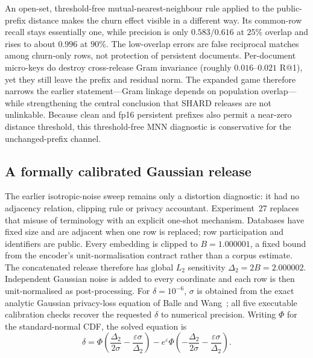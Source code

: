 \documentclass[11pt,a4paper]{article}
\begin{document}
An open-set, threshold-free mutual-nearest-neighbour rule applied to the
public-prefix distance makes the churn effect visible in a different way. Its
common-row recall stays essentially one, while precision is only
$0.583$/$0.616$ at $25\%$ overlap and rises to about $0.996$ at $90\%$. The
low-overlap errors are false reciprocal matches
among churn-only rows, not protection of persistent documents. Per-document
micro-keys do destroy cross-release Gram invariance (roughly $0.016$--$0.021$
R@1), yet they still leave the prefix and residual norm. The expanded game
therefore narrows the earlier statement---Gram linkage depends on population
overlap---while strengthening the central conclusion that SHARD releases are
not unlinkable. Because clean and fp16 persistent prefixes also permit a
near-zero distance threshold, this threshold-free MNN diagnostic is
conservative for the unchanged-prefix channel.

\subsection{A formally calibrated Gaussian release}\label{ssec:shard-vs-dp}

The earlier isotropic-noise sweep remains only a distortion diagnostic: it
had no adjacency relation, clipping rule or privacy accountant. Experiment~27
replaces that misuse of terminology with an explicit one-shot mechanism.
Databases have fixed size and are adjacent when one row is replaced; row
participation and identifiers are public. Every embedding is clipped to
$B=1.000001$, a fixed bound from the encoder's unit-normalisation contract
rather than a corpus estimate. The concatenated release therefore has global
$L_2$ sensitivity $\Delta_2=2B=2.000002$. Independent Gaussian noise is added
to every coordinate and each row is then unit-normalised as post-processing.
For $\delta=10^{-6}$, $\sigma$ is obtained from the exact analytic Gaussian
privacy-loss equation of Balle and Wang~\cite{ref_analytic_gaussian}; all five
executable calibration checks recover the requested $\delta$ to numerical
precision.
Writing $\Phi$ for the standard-normal CDF, the solved equation is
\[
\delta=\Phi\!\left(\frac{\Delta_2}{2\sigma}
                 -\frac{\varepsilon\sigma}{\Delta_2}\right)
-e^{\varepsilon}\Phi\!\left(-\frac{\Delta_2}{2\sigma}
                 -\frac{\varepsilon\sigma}{\Delta_2}\right).
\]
\end{document}
